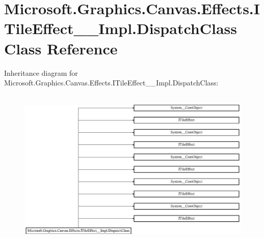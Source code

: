\hypertarget{class_microsoft_1_1_graphics_1_1_canvas_1_1_effects_1_1_i_tile_effect_____impl_1_1_dispatch_class}{}\section{Microsoft.\+Graphics.\+Canvas.\+Effects.\+I\+Tile\+Effect\+\_\+\+\_\+\+Impl.\+Dispatch\+Class Class Reference}
\label{class_microsoft_1_1_graphics_1_1_canvas_1_1_effects_1_1_i_tile_effect_____impl_1_1_dispatch_class}
Inheritance diagram for Microsoft.\+Graphics.\+Canvas.\+Effects.\+I\+Tile\+Effect\+\_\+\+\_\+\+Impl.\+Dispatch\+Class\+:\begin{figure}[H]
\begin{center}
\leavevmode
\includegraphics[height=7.738694cm]{class_microsoft_1_1_graphics_1_1_canvas_1_1_effects_1_1_i_tile_effect_____impl_1_1_dispatch_class}
\end{center}
\end{figure}
